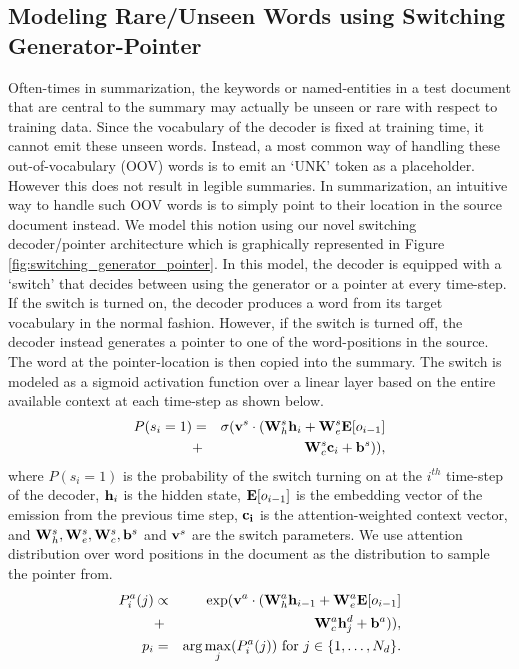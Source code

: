 \subsection{Modeling Rare/Unseen Words using Switching Generator-Pointer}\label{sec:switch}
Often-times in summarization, the keywords or named-entities in a test document that are central to the summary may actually be unseen or rare with respect to training data. Since the vocabulary of the decoder is fixed at training time, it cannot emit these unseen words. Instead, a most common way of handling these out-of-vocabulary (OOV) words is to emit  an `UNK' token as a placeholder. However this does not result in legible summaries. In summarization, an intuitive way to handle such OOV words is to simply point to their location in the source document instead. We model this notion using our novel switching decoder/pointer architecture which is graphically represented in Figure \ref{fig:switching_generator_pointer}. In this model, the decoder is equipped with a `switch' that decides between using the generator or a pointer at every time-step. If the switch is turned on, the decoder produces a word from its target vocabulary in the normal fashion. However, if the switch is turned off, the decoder instead generates a pointer to one of the word-positions in the source. The word at the pointer-location is then copied into the summary.  The switch is modeled as a sigmoid activation function over a linear layer based on the entire available context at each time-step as shown below.
\begin{eqnarray}
P(s_i=1) &=& \sigma({{\bf v}^s}\cdot({\bf W}^s_h{\bf h}_i + {\bf W}^s_e{\bf E}[o_{i-1}] \nonumber\\
             &+& {\bf W}^s_c{\bf c}_i + {\bf b}^s)),\nonumber
\end{eqnarray}
where $P(s_i=1)$ is the probability of the switch turning on at the $i^{th}$ time-step of the decoder, ${\bf h}_i$ is the hidden state,  ${\bf E}[o_{i-1}]$ is the embedding vector of the emission from the previous time step, ${\bf c_i}$ is the attention-weighted context vector, and ${\bf W}_h^s, {\bf W}_e^s, {\bf W}_c^s, {\bf b}^s$ and ${\bf v}^s$ are the switch parameters. We use attention distribution over word positions in the document as the distribution to sample the pointer from.
\begin{eqnarray}
P^a_i(j)    &\propto&  \exp({{\bf v}^a}\cdot({\bf W}_h^a{\bf h}_{i-1} + {\bf W}^a_e{\bf E}[o_{i-1}] \nonumber\\
            &+& {\bf W}^a_c{\bf h}^d_j + {\bf b}^a)), \nonumber \\
 p_i &=& \arg\max_j (P^a_i(j))~\mbox{for}~j \in \{1,\ldots,N_d\}\nonumber.
\end{eqnarray}
